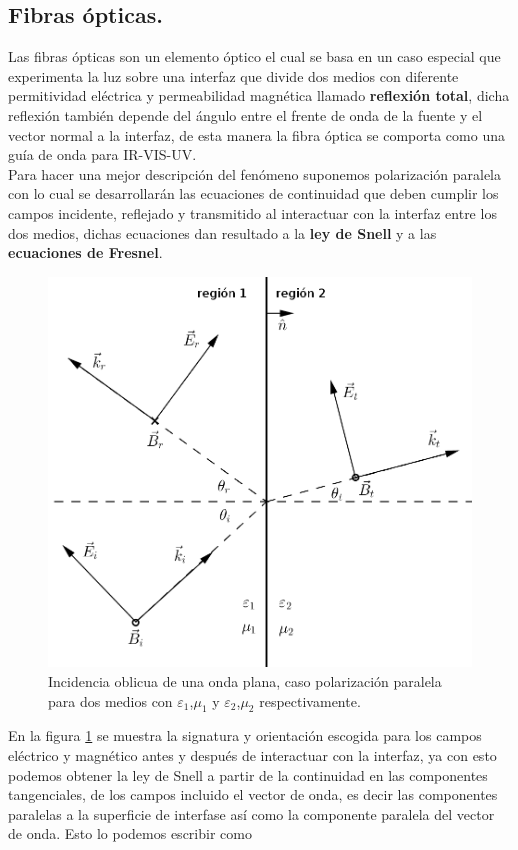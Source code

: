 \subsection{Fibras ópticas.}
Las fibras ópticas son un elemento óptico el cual se basa en un caso especial que experimenta la luz sobre una interfaz que divide dos medios con diferente permitividad eléctrica y permeabilidad magnética llamado \textbf{reflexión total}, dicha reflexión también depende del ángulo entre el frente de onda de la fuente y el vector normal a la interfaz, de esta manera la fibra óptica se comporta como una guía de onda para IR-VIS-UV.\\
Para hacer una mejor descripción del fenómeno suponemos polarización paralela con lo cual se desarrollarán las ecuaciones de continuidad que deben cumplir los campos incidente, reflejado y transmitido al interactuar con la interfaz entre los dos medios, dichas ecuaciones dan resultado a la \textbf{ley de Snell} y a las \textbf{ecuaciones de Fresnel}. 

\begin{figure}[H]
\centering
\includegraphics[width=0.46\linewidth]{Kap1/interfaz.png}
\caption{Incidencia oblicua de una onda plana, caso polarización paralela para dos medios con $\varepsilon_1$,$\mu_1$ y $\varepsilon_2$,$\mu_2$ respectivamente.} 
\label{interfaz}
\end{figure}

En la figura \ref{interfaz} se muestra la signatura y orientación escogida para los campos eléctrico y magnético antes y después de interactuar con la interfaz, ya con esto podemos obtener la ley de Snell a partir de la continuidad en las componentes tangenciales, de los campos incluido el vector de onda, es decir las componentes paralelas a la superficie de interfase así como la componente paralela del vector de onda. Esto lo podemos escribir como

